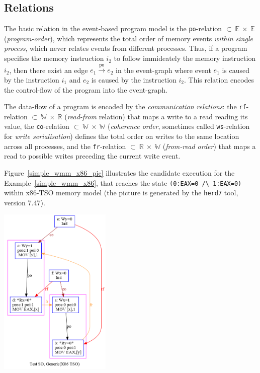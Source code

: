 \subsection{Relations}
\label{ch:wmm:model:relations}

The basic relation in the event-based program model is the \texttt{po}-relation $\subset~\mathbb{E}~\times~\mathbb{E}$ (\textit{program-order}), which represents the total order of memory events \textit{within single process}, which never relates events from different processes. Thus, if a program specifies the memory instruction $i_2$ to follow immideately the memory instruction $i_2$, then there exist an edge $e_1 \xrightarrow{\texttt{po}} e_2$ in the event-graph where event $e_1$ is caused by the instruction $i_1$ and $e_2$ is caused by the instruction $i_2$. This relation encodes the control-flow of the program into the event-graph.

The data-flow of a program is encoded by the \textit{communication relations}: the \texttt{rf}-relation $\subset~\mathbb{W}~\times~\mathbb{R}$ (\textit{read-from} relation) that maps a write to a read reading its value, the \texttt{co}-relation $\subset~\mathbb{W}~\times~\mathbb{W}$ (\textit{coherence order}, sometimes called \texttt{ws}-relation for \textit{write serialisation}) defines the total order on writes to the same location across all processes, and the \texttt{fr}-relation $\subset~\mathbb{R}~\times~\mathbb{W}$ (\textit{from-read order}) that maps a read to possible writes preceding the current write event.

Figure~\ref{simple_wmm_x86_pic} illustrates the candidate execution for the Example~\ref{simple_wmm_x86}, that reaches the state \texttt{(0:EAX=0~/\textbackslash~1:EAX=0)} within x86-TSO memory model (the picture is generated by the \texttt{herd7} tool, version 7.47). 

\includegraphics[width=0.4\textwidth]{img/my/simple_wmm_x86.png}
\label{simple_wmm_x86_pic}



